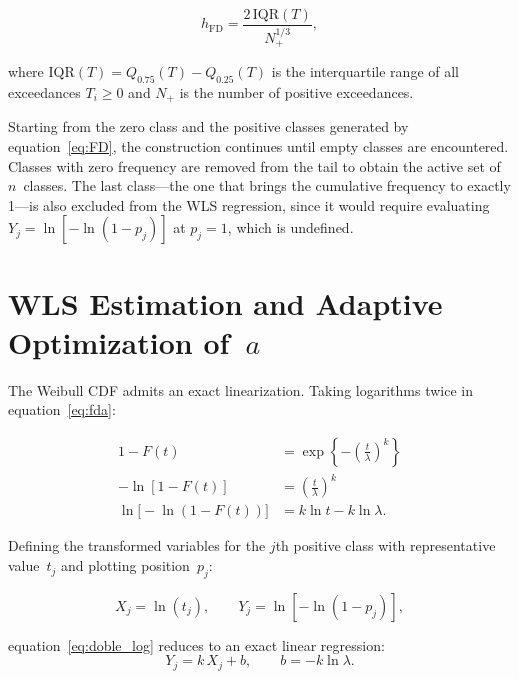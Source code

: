 \documentclass[APA,STIX1COL]{WileyNJD-v2}
\begin{document}
\begin{equation}\label{eq:FD}
h_{\mathrm{FD}}
  = \frac{2\,\mathrm{IQR}(T)}{N_+^{1/3}},
\end{equation}

\medskip

where $\mathrm{IQR}(T)=Q_{0.75}(T)-Q_{0.25}(T)$ is the
interquartile range of all exceedances $T_i\geq 0$ and $N_+$ is
the number of positive exceedances.

\medskip

Starting from the zero class and the positive classes generated
by equation~\eqref{eq:FD}, the construction continues until empty
classes are encountered. Classes with zero frequency are removed
from the tail to obtain the active set of $n$~classes. The last
class---the one that brings the cumulative frequency to exactly
1---is also excluded from the WLS regression, since it would
require evaluating $Y_j=\ln[-\ln(1-p_j)]$ at $p_j=1$, which is
undefined.

\section{WLS Estimation and Adaptive Optimization of~$a$}
\label{sec:estimation}

The Weibull CDF admits an exact linearization. Taking logarithms
twice in equation~\eqref{eq:fda}:

\begin{align}
1 - F(t) &= \exp\!\left\{-\!\left(\frac{t}{\lambda}\right)^{\!k}\right\}
  \nonumber\\[4pt]
-\ln[1-F(t)] &= \left(\frac{t}{\lambda}\right)^{\!k}
  \nonumber\\[4pt]
\ln\!\bigl[-\ln(1-F(t))\bigr] &= k\ln t - k\ln\lambda.
  \label{eq:doble_log}
\end{align}

\medskip

Defining the transformed variables for the $j$th positive class
with representative value~$t_j$ and plotting position~$p_j$:

\begin{equation}\label{eq:XY}
X_j = \ln(t_j),\qquad Y_j = \ln[-\ln(1-p_j)],
\end{equation}

\medskip
equation~\eqref{eq:doble_log} reduces to an exact linear
regression:
\begin{equation}\label{eq:lineal}
Y_j = k\,X_j + b,\qquad b = -k\ln\lambda.
\end{equation}
\end{document}

